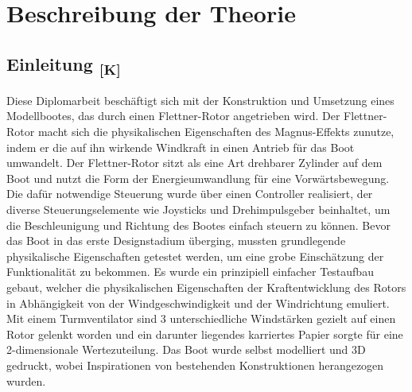 \documentclass[a4paper,12pt]{article}
\begin{document}
\section{Beschreibung der Theorie}

\subsection*{\texorpdfstring{Einleitung \textsubscript{[K]}}{Von handelt die Arbeit [K]}}
Diese Diplomarbeit beschäftigt sich mit der Konstruktion und Umsetzung eines Modellbootes, das durch einen Flettner-Rotor angetrieben wird. Der Flettner-Rotor macht sich die physikalischen Eigenschaften des Magnus-Effekts zunutze, indem er die auf ihn wirkende Windkraft in einen Antrieb für das Boot umwandelt. Der Flettner-Rotor sitzt als eine Art drehbarer Zylinder auf dem Boot und nutzt die Form der Energieumwandlung für eine Vorwärtsbewegung. Die dafür notwendige Steuerung wurde über einen Controller realisiert, der diverse Steuerungselemente wie Joysticks und Drehimpulsgeber beinhaltet, um die Beschleunigung und Richtung des Bootes einfach steuern zu können. 
Bevor das Boot in das erste Designstadium überging, mussten grundlegende physikalische Eigenschaften getestet werden, um eine grobe Einschätzung der Funktionalität zu bekommen. Es wurde ein prinzipiell einfacher Testaufbau gebaut, welcher die physikalischen Eigenschaften der Kraftentwicklung des Rotors in Abhängigkeit von der Windgeschwindigkeit und der Windrichtung emuliert. Mit einem Turmventilator sind 3 unterschiedliche Windstärken gezielt auf einen Rotor gelenkt worden und ein darunter liegendes karriertes Papier sorgte für eine 2-dimensionale Wertezuteilung. 
Das Boot wurde selbst modelliert und 3D gedruckt, wobei Inspirationen von bestehenden Konstruktionen herangezogen wurden.
\end{document}

